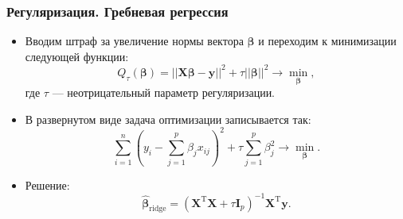 \documentclass[ucs, notheorems, handout]{beamer}
\begin{document}

\begin{frame}
	\frametitle{Регуляризация. Гребневая регрессия}

\begin{itemize}
	\item Вводим штраф за увеличение нормы вектора $\bm \beta$ и переходим к минимизации следующей функции:
	\begin{equation*}
		Q_{\tau}(\bm \beta)
		=
		||\bm{X} \bm \beta-\bm y||^{2}
		+
		\tau||\bm \beta||^{2}
		\rightarrow\min_{\bm \beta},
	\end{equation*}
	где $\tau$ --- неотрицательный параметр регуляризации.
	\item В развернутом виде задача оптимизации записывается так:
	\begin{equation*}
		\sum_{i=1}^{n}
		\left(
		y_{i}
		-
		\sum_{j=1}^{p}\beta_{j}x_{ij}
		\right)^{2}
		+
		\tau\sum_{j=1}^{p}\beta_{j}^{2}
		\rightarrow\min_{\bm \beta}.
	\end{equation*}
	\item Решение:
	\begin{equation*}
		\hat{\bm \beta}_{\text{ridge}}
		=
		(\bm{X}^{\mathrm{T}}\bm{X}+\tau\bm{I}_{p})^{-1}\bm{X}^{\mathrm{T}} \bm y.
	\end{equation*}
\end{itemize}

\end{frame}
\end{document}
